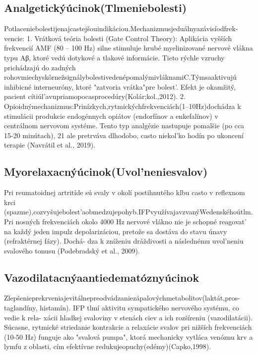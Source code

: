 \subsection{Analgetickýúcinok(Tlmeniebolesti)}

Potlaceniebolestijenajcastejšouindikáciou.Mechanizmusjeduálnyazávisíodfrek- vencie: 1. Vrátková teória bolesti (Gate Control Theory): Aplikácia vyšších frekvencií AMF (80 -- 100 Hz) silne stimuluje hrubé myelinizované nervové vlákna typu Aβ, ktoré vedú dotykové a tlakové informácie. Tieto rýchle vzruchy prichádzajú do zadných rohovmiechyskôrnežsignálybolestivedenépomalýmivláknamiC.Týmsaaktivujú inhibicné interneuróny, ktoré "zatvoria vrátka"pre bolest’. Efekt je okamžitý, pacient cítiúl’avupriamopocasprocedúry(Kolár;kol.,2012). 2. Opioidnýmechanizmus:Prinízkych,rytmickýchfrekvenciách(1--10Hz)dochádza k stimulácii produkcie endogénnych opiátov (endorfínov a enkefalínov) v centrálnom nervovom systéme. Tento typ analgézie nastupuje pomalšie (po cca 15-20 minútach), 21 ale pretrváva dlhodobo, casto niekol’ko hodín po ukoncení terapie (Navrátil et al., 2019).


\subsection{Myorelaxacnýúcinok(Uvol’neniesvalov)}

Pri reumatoidnej artritíde sú svaly v okolí postihnutého klbu casto v reflexnom krci (spazme),cozvyšujebolest’aobmedzujepohyb.IFPvyužívajavzvanýWedenskéhoútlm. Pri nosných frekvenciách okolo 4000 Hz nervové vlákno nie je schopné reagovat’ na každý jeden impulz depolarizáciou, pretože sa dostáva do stavu únavy (refraktérnej fázy). Dochá- dza k zníženiu dráždivosti a následnému uvol’neniu svalového tonusu (Podebradský et al., 2009).


\subsection{Vazodilatacnýaantiedematóznyúcinok}

Zlepšenieprekrveniajevitálnepreodvádzaniezápalovýchmetabolitov(laktát,pros- taglandíny, histamín). IFP tlmí aktivitu sympatického nervového systému, co vedie k rela- xácii hladkej svaloviny v stenách ciev a ich rozšíreniu (vazodilatácii). Súcasne, rytmické striedanie kontrakcie a relaxácie svalov pri nižších frekvenciách (10-50 Hz) funguje ako "svalová pumpa", ktorá mechanicky vytláca venóznu krv a lymfu z oblasti, cím efektívne redukujeopuchy(edémy)(Capko,1998).


